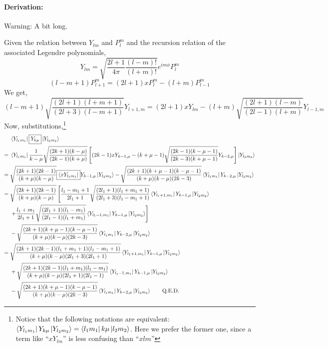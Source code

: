 \paragraph{Derivation:}
Warning: A bit long.

Given the relation between $Y_{lm}$ and $P_l^m$
and the recursion relation of the associated Legendre polynomials,
\begin{equation} \label{eq:PtoY}
Y_{lm} = \sqrt{\frac{2l+1}{4\pi}\frac{(l-m)!}{(l+m)!}} e^{im\phi} P_l^m
\end{equation}
\begin{equation} \label{eq:Prec}
(l-m+1)P_{l+1}^m = (2l+1)xP_l^m - (l+m)P_{l-1}^m
\end{equation}
We get,
\begin{equation} \label{eq:Yrec}
(l-m+1)\sqrt{\frac{(2l+1)(l+m+1)}{(2l+3)(l-m+1)}} Y_{l+1,m} = (2l+1)xY_{lm} - (l+m)\sqrt{\frac{(2l+1)(l-m)}{(2l-1)(l+m)}} Y_{l-1,m}
\end{equation}
Now, substitutions,\footnote{Notice that the following
notations are equivalent: $\Bra{Y_{l_1m_1}}Y_{k\mu}\Ket{Y_{l_2m_2}} = \Bra{l_1m_1}k\mu\Ket{l_2m_2}$.
Here we prefer the former one, since a term like ``$xY_{lm}$'' is less confusing than
``$xlm$''}
\begin{align}
& \Bra{Y_{l_1m_1}} \boxed{Y_{k\mu}} \Ket{Y_{l_2m_2}} \nonumber \\
= {} & \Bra{Y_{l_1m_1}} \frac{1}{k-\mu}\sqrt{\frac{(2k+1)(k-\mu)}{(2k-1)(k+\mu)}}
\left[ (2k-1)xY_{k-1,\mu} - (k+\mu-1)\sqrt{\frac{(2k-1)(k-\mu-1)}{(2k-3)(k+\mu-1)}}Y_{k-2,\mu} \right]
\Ket{Y_{l_2m_2}} \nonumber \\
= {} & \sqrt{\frac{(2k+1)(2k-1)}{(k+\mu)(k-\mu)}}
\boxed{\Bra{xY_{l_1m_1}}} Y_{k-1,\mu} \Ket{Y_{l_2m_2}}
-\sqrt{\frac{(2k+1)(k+\mu-1)(k-\mu-1)}{(k+\mu)(k-\mu)(2k-3)}}
\Bra{Y_{l_1m_1}} Y_{k-2,\mu} \Ket{Y_{l_2m_2}} \nonumber \\
= {} & \sqrt{\frac{(2k+1)(2k-1)}{(k+\mu)(k-\mu)}} \left[
\frac{l_1-m_1+1}{2l_1+1}\sqrt{\frac{(2l_1+1)(l_1+m_1+1)}{(2l_1+3)(l_1-m_1+1)}}
\Bra{Y_{l_1+1,m_1}} Y_{k-1,\mu} \Ket{Y_{l_2m_2}} \right. \nonumber \\
& \left. + \frac{l_1+m_1}{2l_1+1}\sqrt{\frac{(2l_1+1)(l_1-m_1)}{(2l_1-1)(l_1+m_1)}}
\Bra{Y_{l_1-1,m_1}} Y_{k-1,\mu} \Ket{Y_{l_2m_2}} \right] \nonumber \\
& -\sqrt{\frac{(2k+1)(k+\mu-1)(k-\mu-1)}{(k+\mu)(k-\mu)(2k-3)}}
\Bra{Y_{l_1m_1}} Y_{k-2,\mu} \Ket{Y_{l_2m_2}} \nonumber \\
= {} & \sqrt{\frac{(2k+1)(2k-1)(l_1+m_1+1)(l_1-m_1+1)}{(k+\mu)(k-\mu)(2l_1+3)(2l_1+1)}}
\Bra{Y_{l_1+1,m_1}} Y_{k-1,\mu} \Ket{Y_{l_2m_2}} \nonumber \\
& + \sqrt{\frac{(2k+1)(2k-1)(l_1+m_1)(l_1-m_1)}{(k+\mu)(k-\mu)(2l_1+1)(2l_1-1)}}
\Bra{Y_{l_1-1,m_1}} Y_{k-1,\mu} \Ket{Y_{l_2m_2}} \nonumber \\
& -\sqrt{\frac{(2k+1)(k+\mu-1)(k-\mu-1)}{(k+\mu)(k-\mu)(2k-3)}}
\Bra{Y_{l_1m_1}} Y_{k-2,\mu} \Ket{Y_{l_2m_2}} \qquad \text{Q.E.D.}
\end{align}

